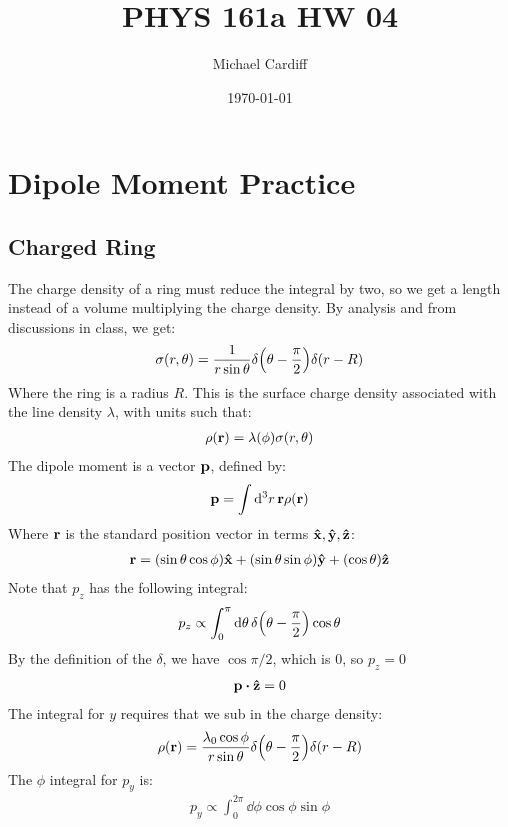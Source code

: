 \documentclass[12pt]{article}
\title{\vspace{-3em}PHYS 161a HW 04}
\author{Michael Cardiff}
\date{\today}
\begin{document}
\maketitle

\section{Dipole Moment Practice}
\subsection{Charged Ring}
The charge density of a ring must reduce the integral by two, so we get a length instead of a volume multiplying the charge density. By analysis and from discussions in class, we get:
\begin{align*}
  \sigma(r,\theta)=\frac1{r\sin\theta}\delta\qty(\theta-\frac\pi2)\delta(r-R)
\end{align*}
Where the ring is a radius $R$. This is the surface charge density associated with the line density $\lambda$, with units such that:
\begin{align*}
  \rho(\vb{r})=\lambda(\phi)\sigma(r,\theta)
\end{align*}
The dipole moment is a vector $\vb{p}$, defined by:
\begin{align*}
  \vb{p}=\int\dd[3]{r}\vb{r}\rho(\vb{r})
\end{align*}
Where $\vb{r}$ is the standard position vector in terms $\vu{x},\vu{y},\vu{z}$:
\begin{align*}
  \vb{r}=
  \qty(\sin\theta\cos\phi)\vu{x}+
  \qty(\sin\theta\sin\phi)\vu{y}+
  \qty(\cos\theta)\vu{z}
\end{align*}
Note that $p_z$ has the following integral:
\begin{align*}
  p_z\propto\int_0^\pi\dd{\theta}\delta\qty(\theta-\frac\pi2)\cos\theta
\end{align*}
By the definition of the $\delta$, we have $\cos\pi/2$, which is $0$, so $p_z=0$
\begin{align*}
  \vb{p}\vdot\vu{z}=0
\end{align*}
The integral for $y$ requires that we sub in the charge density:
\begin{align*}
  \rho(\vb{r})=\frac{\lambda_0\cos\phi}{r\sin\theta}
  \delta\qty(\theta-\frac\pi2)\delta(r-R)
\end{align*}
The $\phi$ integral for $p_y$ is:
\begin{align*}
  p_y\propto\int_0^{2\pi}\dd{\phi}\cos\phi\sin\phi
\end{align*}
\end{document}
